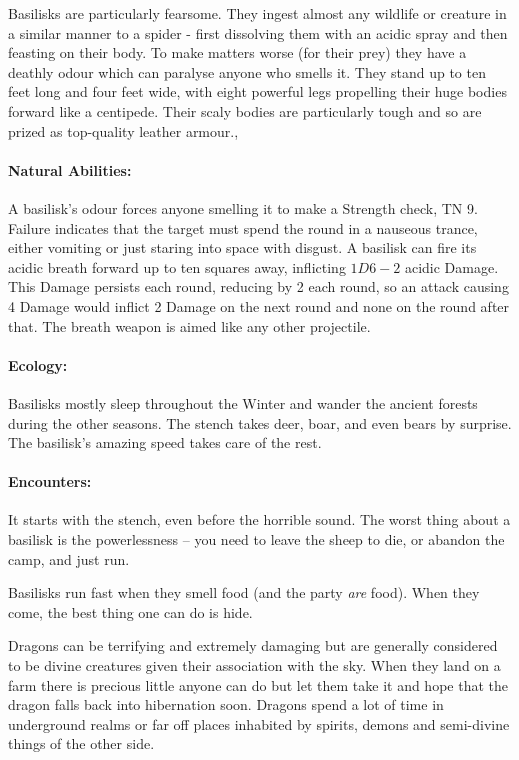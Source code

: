 \label{basilisk}
\basilisk

Basilisks are particularly fearsome.  They ingest almost any wildlife or creature in a similar manner to a spider - first dissolving them with an acidic spray and then feasting on their body.  To make matters worse (for their prey) they have a deathly odour which can paralyse anyone who smells it.  They stand up to ten feet long and four feet wide, with eight powerful legs propelling their huge bodies forward like a centipede.  Their scaly bodies are particularly tough and so are prized as top-quality leather armour.,

	\paragraph{Natural Abilities:} A basilisk's odour forces anyone smelling it to make a Strength check, TN 9.  Failure indicates that the target must spend the round in a nauseous trance, either vomiting or just staring into space with disgust.  A basilisk can fire its acidic breath forward up to ten squares away, inflicting $1D6-2$ acidic Damage.  This Damage persists each round, reducing by 2  each round, so an attack causing 4 Damage would inflict 2  Damage on the next round and none on the round after that.  The breath weapon is aimed like any other projectile.

	\paragraph{Ecology:} Basilisks mostly sleep throughout the Winter and wander the ancient forests during the other seasons.  The stench takes deer, boar, and even bears by surprise.  The basilisk's amazing speed takes care of the rest.

	\paragraph{Encounters:} It starts with the stench, even before the horrible sound.  The worst thing about a basilisk is the powerlessness -- you need to leave the sheep to die, or abandon the camp, and just run.

	Basilisks run fast when they smell food (and the party \emph{are} food).  When they come, the best thing one can do is hide.

\label{dragon}

\dragon

Dragons can be terrifying and extremely damaging but are generally considered to be divine creatures given their association with the sky.  When they land on a farm there is precious little anyone can do but let them take it and hope that the dragon falls back into hibernation soon.  Dragons spend a lot of time in underground realms or far off places inhabited by spirits, demons and semi-divine things of the other side.

